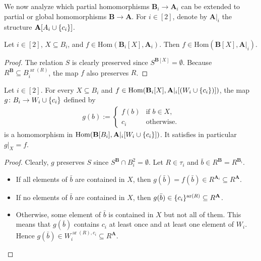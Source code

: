 \documentclass[a4paper,english, thm-restate]{lipics-v2021}
\DeclarePairedDelimiter\set{\lbrace}{\rbrace}
\newcommand{\tup}[1]{\bar{#1}}
\newcommand{\sig}{\tau}
\newcommand{\arity}[1]{\operatorname*{ar}(#1)}
\newcommand{\StructA}{\mathbf{A}}
\newcommand{\StructB}{\mathbf{B}}
\newcommand{\restrict}[2]{#1|_{#2}}
\newcommand{\Hom}[2]{\mathrm{Hom}(#1,#2)}
\begin{document}
	\noindent We now analyze which partial homomorphisms $\StructB_i \to \StructA_i$
	can be extended to partial or global homomorphisms $\StructB \to \StructA$.
	For $i\in[2]$, denote by $\restrict{\StructA}{i}$ the structure $\StructA[A_i\cup\set{c_i}]$.
	
	\begin{lemma}
		\label{lem:hom-or-embedd}
		Let $i \in [2]$, $X \subseteq B_i$, and
		$f \in \Hom{\StructB_i[X]}{\StructA_i}$.
		Then $f \in \Hom{\StructB[X]}{\restrict{\StructA}{i}}$.
	\end{lemma}
	\begin{proof}
		The relation $S$ is clearly preserved
		since $S^{\StructB[X]} =\emptyset$.
		Because $R^\StructB \subseteq B_i^{\arity{R}}$,
		the map $f$ also preserves $R$.
	\end{proof}
	
	\begin{lemma}
		\label{lem:hom-or-extend}
		Let $i \in [2]$.
		For every $X \subseteq B_i$ and $f\in \Hom{\StructB_i[X]}{\restrict{\StructA}{i}[(W_i\cup \set{c_i})]}$,
		the map $g \colon B_i \to W_i \cup \set{c_i}$ defined by
		\begin{align*}
			g(b) := \begin{cases}
				f(b) & \text{if } b \in X, \\
				c_i	& \text{otherwise.}
			\end{cases}
		\end{align*}
		is a homomorphism in  $\Hom{\StructB[B_i]}{\restrict{\StructA}{i}[W_i\cup \set{c_i}]}$.
		It satisfies in particular $\restrict{g}{X} = f$. 
	\end{lemma}
	\begin{proof}
		Clearly, $g$ preserves $S$ since $S^\StructB \cap B_i^2 = \emptyset$.
		Let $R \in \sig_i$ and $\tup{b} \in R^\StructB = R^{\StructB_i}$.
		\begin{itemize}
			\item If all elements of $\tup{b}$ are contained in $X$,
			then $g(\tup{b}) = f(\tup{b}) \in R^{\StructA_i} \subseteq R^\StructA$.
			\item If no elements of $\tup{b}$ are contained in $X$,
			then $g(\tup{b}) \in \set{c_i}^{\arity{R}} \subseteq R^\StructA$.
			\item Otherwise, some element of $\tup{b}$ is contained in $X$
			but not all of them. This means that $g(\tup{b})$ contains $c_i$ at least once
			and at least one element of $W_i$.
			Hence $g(\tup{b}) \in W_i^{\arity{R},c_i} \subseteq R^\StructA$. \qedhere
		\end{itemize}
	\end{proof}
	
\end{document}
